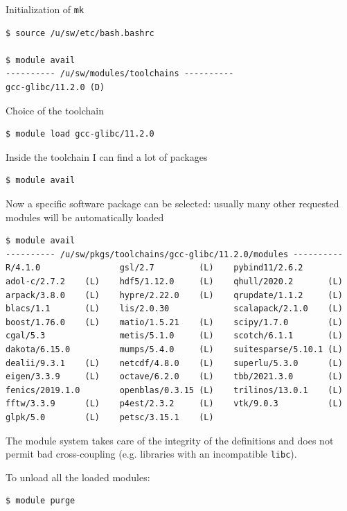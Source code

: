 \documentclass[10pt,aspectratio=169]{beamer}
\begin{document}
\begin{frame}[fragile]

  Initialization of \texttt{mk}

\begin{verbatim}
$ source /u/sw/etc/bash.bashrc

$ module avail
---------- /u/sw/modules/toolchains ----------
gcc-glibc/11.2.0 (D)
\end{verbatim}

Choice of the toolchain
\begin{verbatim}
$ module load gcc-glibc/11.2.0
\end{verbatim}

Inside the toolchain I can find a lot of packages
\begin{verbatim}
$ module avail
\end{verbatim}
\end{frame}


\begin{frame}[fragile]
  \small
  Now a specific software package can be selected: usually many other requested modules will be automatically loaded
\begin{verbatim}
$ module avail
---------- /u/sw/pkgs/toolchains/gcc-glibc/11.2.0/modules ----------
R/4.1.0                gsl/2.7         (L)    pybind11/2.6.2
adol-c/2.7.2    (L)    hdf5/1.12.0     (L)    qhull/2020.2       (L)
arpack/3.8.0    (L)    hypre/2.22.0    (L)    qrupdate/1.1.2     (L)
blacs/1.1       (L)    lis/2.0.30             scalapack/2.1.0    (L)
boost/1.76.0    (L)    matio/1.5.21    (L)    scipy/1.7.0        (L)
cgal/5.3               metis/5.1.0     (L)    scotch/6.1.1       (L)
dakota/6.15.0          mumps/5.4.0     (L)    suitesparse/5.10.1 (L)
dealii/9.3.1    (L)    netcdf/4.8.0    (L)    superlu/5.3.0      (L)
eigen/3.3.9     (L)    octave/6.2.0    (L)    tbb/2021.3.0       (L)
fenics/2019.1.0        openblas/0.3.15 (L)    trilinos/13.0.1    (L)
fftw/3.3.9      (L)    p4est/2.3.2     (L)    vtk/9.0.3          (L)
glpk/5.0        (L)    petsc/3.15.1    (L)
\end{verbatim}

The module system takes care of the integrity of the definitions and does not permit bad cross-coupling (e.g. libraries with an incompatible \texttt{libc}).\smallskip

To unload all the loaded modules:
\begin{verbatim}
$ module purge
\end{verbatim}
\end{frame}
\end{document}
